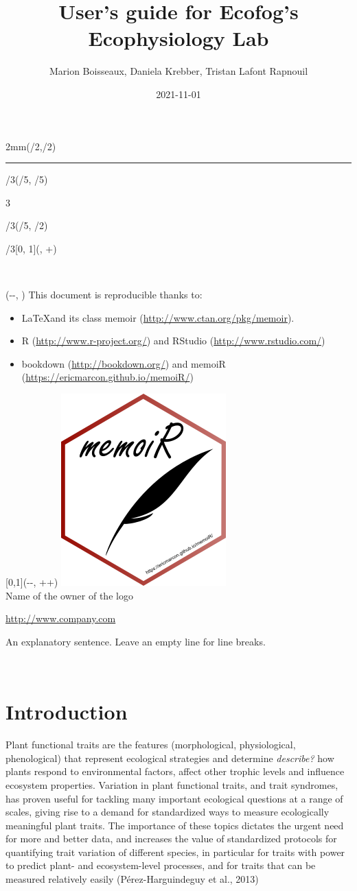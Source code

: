 \documentclass[
  12pt,
  american,
  a4paper,
  extrafontsizes,onecolumn,openright
  ]{memoir}
\title{User's guide for Ecofog's Ecophysiology Lab}
\author{Marion Boisseaux, Daniela Krebber, Tristan Lafont Rapnouil}
\date{2021-11-01}
\makeatletter
\newcommand{\MemoirChapStyle}{daleif1}
\newcommand{\MemoirPageStyle}{Ruled}
\newlength\widthw %
\newcommand*{\SmallMargins}{
  \setlrmarginsandblock{1.5in}{1.5in}{*}
  \setmarginnotes{0.1in}{0.1in}{0.1in}
 \setulmarginsandblock{1.5in}{1in}{*}
  \checkandfixthelayout
  \ch@ngetext
  \clearpage
  \setlength{\widthw}{\textwidth+\marginparsep+\marginparwidth}
  \footnotesatfoot
  \chapterstyle{\MemoirChapStyle}  %
  \pagestyle{\MemoirPageStyle}
}
\newcommand{\LargeMargins}{\SmallMargins}
\newcommand{\MainTitlePage}[2]{
  \SmallMargins %
  \pagestyle{empty} %
  \textblockorigin{\stockwidth-\paperwidth-\trimedge}{\trimtop} %
  \begin{textblock*}{2mm}(\spinemargin/2,\uppermargin/2)
    \rule{1pt}{\paperheight-\uppermargin}
  \end{textblock*}
  \begin{textblock*}{\paperwidth*2/3}(\paperwidth/5, \paperheight/5)
    \flushright
    \begin{Spacing}{3}
      {\fontfamily{qtm}\selectfont\fontsize{45}{45}\selectfont\textsc{\thetitle}}
    \end{Spacing}
  \end{textblock*}
    \begin{textblock*}{\paperwidth*2/3}(\paperwidth/5, \paperheight/2)
    \flushright
    {\fontfamily{qtm}\huge\theauthor}
  \end{textblock*}
    \begin{textblock*}{\paperwidth*2/3}[0, 1](\spinemargin, \uppermargin+\textheight)
    \normalfont\thedate
  \end{textblock*}
  ~\\ %
  \newpage
  \textblockorigin{\trimedge}{\trimtop} %
  \begin{textblock*}{\textwidth}(\paperwidth-\spinemargin-\textwidth, \uppermargin)
    #1
  \end{textblock*}
  \begin{textblock*}{\textwidth}[0,1](\paperwidth-\spinemargin-\textwidth, \uppermargin+\textheight+\footskip)
    \centering
    \includegraphics[width=\paperwidth/4]{logo}\\ \bigskip
    #2
  \end{textblock*}
  ~\\ %
  \newpage
}
\makeatother
\begin{document}
\frontmatter



\cleardoublepage

\MainTitlePage{This document is reproducible thanks to:

\begin{itemize}
  \item \LaTeX and its class memoir (\url{http://www.ctan.org/pkg/memoir}).
  \item R (\url{http://www.r-project.org/}) and RStudio (\url{http://www.rstudio.com/})
  \item bookdown (\url{http://bookdown.org/}) and memoiR (\url{https://ericmarcon.github.io/memoiR/})
\end{itemize}}{Name of the owner of the logo

\url{http://www.company.com}

An explanatory sentence.
Leave an empty line for line breaks.}







\LargeMargins
{
\hypersetup{linkcolor=}
\setcounter{tocdepth}{2}
\tableofcontents
}



\LargeMargins
\mainmatter

\hypertarget{intro}{%
\chapter{Introduction}\label{intro}}

Plant functional traits are the features (morphological, physiological, phenological) that represent ecological strategies and determine \emph{describe?} how plants respond to environmental factors, affect other trophic levels and influence ecosystem properties. Variation in plant functional traits, and trait syndromes, has proven useful for tackling many important ecological questions at a range of scales, giving rise to a demand for standardized ways to measure ecologically meaningful plant traits. The importance of these topics dictates the urgent need for more and better data, and increases the value of standardized protocols for quantifying trait variation of different species, in particular for traits with power to predict plant- and ecosystem-level processes, and for traits that can be measured relatively easily (Pérez-Harguindeguy et al., 2013)
\end{document}
